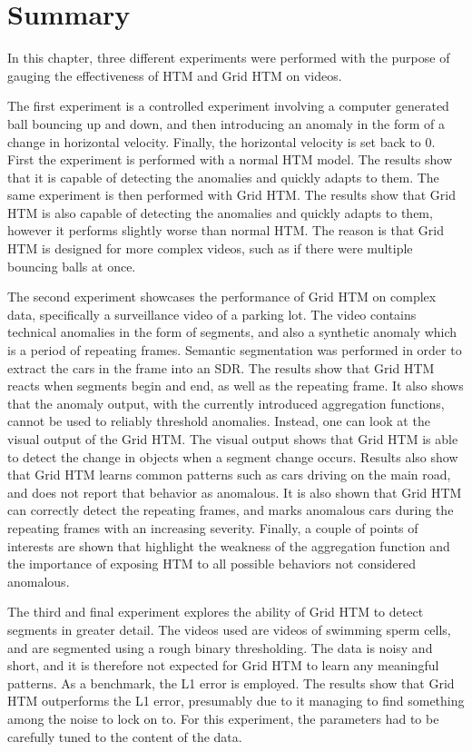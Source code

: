 \section{Summary}
In this chapter, three different experiments were performed with the purpose of gauging the effectiveness of HTM and Grid HTM on videos.
\par
The first experiment is a controlled experiment involving a computer generated ball bouncing up and down, and then introducing an anomaly in the form of a change in horizontal velocity. Finally, the horizontal velocity is set back to 0. First the experiment is performed with a normal HTM model. The results show that it is capable of detecting the anomalies and quickly adapts to them. The same experiment is then performed with Grid HTM. The results show that Grid HTM is also capable of detecting the anomalies and quickly adapts to them, however it performs slightly worse than normal HTM. The reason is that Grid HTM is designed for more complex videos, such as if there were multiple bouncing balls at once.
\par
The second experiment showcases the performance of Grid HTM on complex data, specifically a surveillance video of a parking lot. The video contains technical anomalies in the form of segments, and also a synthetic anomaly which is a period of repeating frames. Semantic segmentation was performed in order to extract the cars in the frame into an SDR. The results show that Grid HTM reacts when segments begin and end, as well as the repeating frame. It also shows that the anomaly output, with the currently introduced aggregation functions, cannot be used to reliably threshold anomalies. Instead, one can look at the visual output of the Grid HTM. The visual output shows that Grid HTM is able to detect the change in objects when a segment change occurs. Results also show that Grid HTM learns common patterns such as cars driving on the main road, and does not report that behavior as anomalous. It is also shown that Grid HTM can correctly detect the repeating frames, and marks anomalous cars during the repeating frames with an increasing severity. Finally, a couple of points of interests are shown that highlight the weakness of the aggregation function and the importance of exposing HTM to all possible behaviors not considered anomalous.
\par
The third and final experiment explores the ability of Grid HTM to detect segments in greater detail. The videos used are videos of swimming sperm cells, and are segmented using a rough binary thresholding. The data is noisy and short, and it is therefore not expected for Grid HTM to learn any meaningful patterns. As a benchmark, the L1 error is employed. The results show that Grid HTM outperforms the L1 error, presumably due to it managing to find something among the noise to lock on to. For this experiment, the parameters had to be carefully tuned to the content of the data.